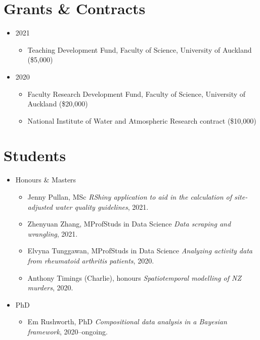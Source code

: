 \documentclass[10pt,a4paper]{moderncv}
\begin{document}
\section{Grants \& Contracts}

\vspace{6pt}
\begin{itemize}
\item 2021
  \begin{itemize}
  \item Teaching Development Fund, Faculty of Science, University of Auckland (\$5,000)
  \end{itemize}
\item 2020
  \begin{itemize}
  \item Faculty Research Development Fund, Faculty of Science, University of Auckland (\$20,000)
  \item National Institute of Water and Atmospheric Research contract (\$10,000)
  \end{itemize}
\end{itemize}

\section{Students}

\vspace{6pt}

\begin{itemize}
\item Honours \& Masters
  \begin{itemize}
  \item Jenny Pullan, MSc \textit{RShiny application to aid in the calculation of site-adjusted water quality guidelines}, 2021.
  \item Zhenyuan Zhang, MProfStuds in Data Science \textit{Data scraping and wrangling}, 2021.
  \item Elvyna Tunggawan, MProfStuds in Data Science \textit{Analyzing activity data from rheumatoid arthritis patients}, 2020.
  \item Anthony Timings (Charlie), honours \textit{Spatiotemporal modelling of NZ murders}, 2020.
  \end{itemize}
\item PhD
  \begin{itemize}
  \item Em Rushworth, PhD \textit{Compositional data analysis in a Bayesian framework}, 2020--ongoing.
  \end{itemize}
\end{itemize}
\end{document}
